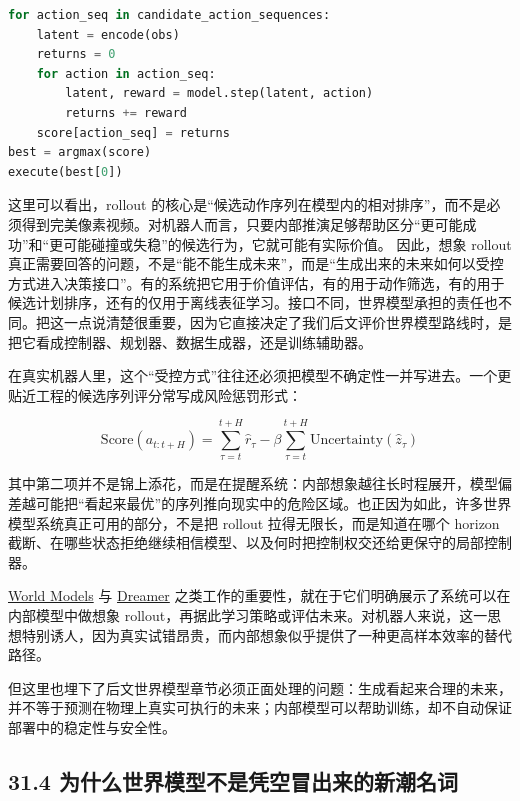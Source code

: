 \begin{lstlisting}[language=python]
for action_seq in candidate_action_sequences:
    latent = encode(obs)
    returns = 0
    for action in action_seq:
        latent, reward = model.step(latent, action)
        returns += reward
    score[action_seq] = returns
best = argmax(score)
execute(best[0])
\end{lstlisting}

这里可以看出，rollout 的核心是“候选动作序列在模型内的相对排序”，而不是必须得到完美像素视频。对机器人而言，只要内部推演足够帮助区分“更可能成功”和“更可能碰撞或失稳”的候选行为，它就可能有实际价值。 因此，想象 rollout 真正需要回答的问题，不是“能不能生成未来”，而是“生成出来的未来如何以受控方式进入决策接口”。有的系统把它用于价值评估，有的用于动作筛选，有的用于候选计划排序，还有的仅用于离线表征学习。接口不同，世界模型承担的责任也不同。把这一点说清楚很重要，因为它直接决定了我们后文评价世界模型路线时，是把它看成控制器、规划器、数据生成器，还是训练辅助器。

在真实机器人里，这个“受控方式”往往还必须把模型不确定性一并写进去。一个更贴近工程的候选序列评分常写成风险惩罚形式：

\begingroup
\scriptsize
\begin{equation*}
\mathrm{Score}(a_{t:t+H})=
\sum_{\tau=t}^{t+H}\hat{r}_\tau
-\beta \sum_{\tau=t}^{t+H}\mathrm{Uncertainty}(\hat{z}_{\tau})
\end{equation*}
\endgroup

其中第二项并不是锦上添花，而是在提醒系统：内部想象越往长时程展开，模型偏差越可能把“看起来最优”的序列推向现实中的危险区域。也正因为如此，许多世界模型系统真正可用的部分，不是把 rollout 拉得无限长，而是知道在哪个 horizon 截断、在哪些状态拒绝继续相信模型、以及何时把控制权交还给更保守的局部控制器。

\href{https://arxiv.org/abs/1803.10122}{World Models} 与 \href{https://arxiv.org/abs/1912.01603}{Dreamer} 之类工作的重要性，就在于它们明确展示了系统可以在内部模型中做想象 rollout，再据此学习策略或评估未来。对机器人来说，这一思想特别诱人，因为真实试错昂贵，而内部想象似乎提供了一种更高样本效率的替代路径。

但这里也埋下了后文世界模型章节必须正面处理的问题：生成看起来合理的未来，并不等于预测在物理上真实可执行的未来；内部模型可以帮助训练，却不自动保证部署中的稳定性与安全性。

\subsection*{31.4 为什么世界模型不是凭空冒出来的新潮名词}


